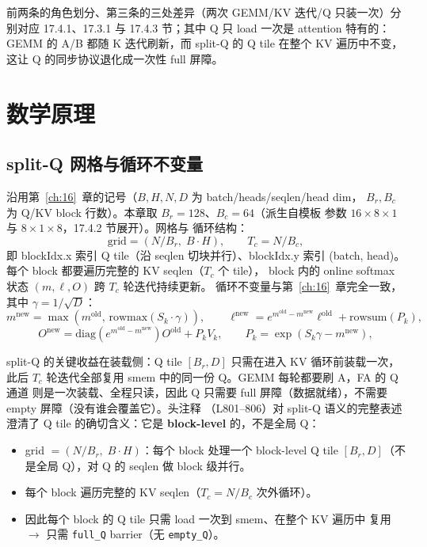 前两条的角色划分、第三条的三处差异（两次 GEMM/KV 迭代/Q 只装一次）分别对应
17.4.1、17.3.1 与 17.4.3 节；其中 Q 只 load 一次是 attention 特有的：
GEMM 的 A/B 都随 K 迭代刷新，而 split-Q 的 Q tile 在整个 KV 遍历中不变，
这让 Q 的同步协议退化成一次性 full 屏障。

\section{数学原理}

\subsection{split-Q 网格与循环不变量}

沿用第~\ref{ch:16}~章的记号（$B, H, N, D$ 为 batch/heads/seqlen/head dim，
$B_r, B_c$ 为 Q/KV block 行数）。本章取 $B_r = 128$、$B_c = 64$（派生自模板
参数 $16 \times 8 \times 1$ 与 $8 \times 1 \times 8$，17.4.2 节展开）。网格与
循环结构：
\begin{equation}
  \text{grid} = (N / B_r,\; B \cdot H), \qquad
  T_c = N / B_c ,
  \label{eq:17-grid}
\end{equation}
即 blockIdx.x 索引 Q tile（沿 seqlen 切块并行）、blockIdx.y 索引
(batch, head)。每个 block 都要遍历完整的 KV seqlen（$T_c$ 个 tile），
block 内的 online softmax 状态 $(m, \ell, O)$ 跨 $T_c$ 轮迭代持续更新。
循环不变量与第~\ref{ch:16}~章完全一致，其中 $\gamma = 1/\sqrt{D}$：
\begin{equation}
  m^{\text{new}} = \max(m^{\text{old}},\, \mathrm{rowmax}(S_k \cdot \gamma)),
  \qquad
  \ell^{\text{new}} = e^{m^{\text{old}} - m^{\text{new}}} \ell^{\text{old}}
    + \mathrm{rowsum}(P_k),
  \label{eq:17-online}
\end{equation}
\begin{equation}
  O^{\text{new}} = \mathrm{diag}\!\left(e^{m^{\text{old}} - m^{\text{new}}}\right)
  O^{\text{old}} + P_k V_k, \qquad
  P_k = \exp(S_k \gamma - m^{\text{new}}),
  \label{eq:17-rescale}
\end{equation}

split-Q 的关键收益在装载侧：Q tile $[B_r, D]$ 只需在进入 KV 循环前装载一次，
此后 $T_c$ 轮迭代全部复用 smem 中的同一份 Q。GEMM 每轮都要刷 A，FA 的 Q 通道
则是一次装载、全程只读，因此 Q 只需要 full 屏障（数据就绪），不需要 empty
屏障（没有谁会覆盖它）。头注释
（L801--806）对 split-Q 语义的完整表述澄清了 Q tile 的确切含义：它是
\textbf{block-level} 的，不是全局 Q：

\begin{itemize}
  \item grid $= (N/B_r,\; B \cdot H)$：每个 block 处理一个 block-level Q
        tile $[B_r, D]$（不是全局 Q），对 Q 的 seqlen 做 block 级并行。
  \item 每个 block 遍历完整的 KV seqlen（$T_c = N/B_c$ 次外循环）。
  \item 因此每个 block 的 Q tile 只需 load 一次到 smem、在整个 KV 遍历中
        复用 $\to$ 只需 \texttt{full\_Q} barrier（无 \texttt{empty\_Q}）。
\end{itemize}

